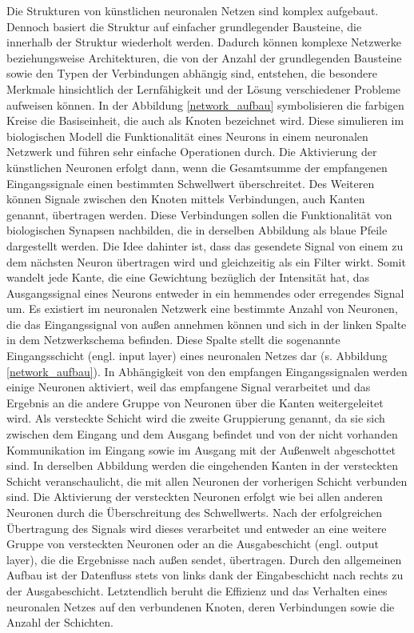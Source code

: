 Die Strukturen von künstlichen neuronalen Netzen sind komplex aufgebaut. Dennoch basiert die Struktur auf einfacher grundlegender Bausteine, die innerhalb der Struktur wiederholt werden. Dadurch können komplexe Netzwerke beziehungsweise Architekturen, die von der Anzahl der grundlegenden Bausteine sowie den Typen der Verbindungen abhängig sind, entstehen, die besondere Merkmale hinsichtlich der Lernfähigkeit und der Lösung verschiedener Probleme aufweisen können. In der Abbildung \ref{network_aufbau} symbolisieren die farbigen Kreise die Basiseinheit, die auch als Knoten bezeichnet wird. Diese simulieren im biologischen Modell die Funktionalität eines Neurons in einem neuronalen Netzwerk und führen sehr einfache Operationen durch. Die Aktivierung der künstlichen Neuronen erfolgt dann, wenn die Gesamtsumme der empfangenen Eingangssignale einen bestimmten Schwellwert überschreitet. Des Weiteren können Signale zwischen den Knoten mittels Verbindungen, auch Kanten genannt, übertragen werden. Diese Verbindungen sollen die Funktionalität von biologischen Synapsen nachbilden, die in derselben Abbildung als blaue Pfeile dargestellt werden. Die Idee dahinter ist, dass das gesendete Signal von einem zu dem nächsten Neuron übertragen wird und gleichzeitig als ein Filter wirkt. Somit wandelt jede Kante, die eine Gewichtung bezüglich der Intensität hat, das Ausgangssignal eines Neurons entweder in ein hemmendes oder erregendes Signal um. Es existiert im neuronalen Netzwerk eine bestimmte Anzahl von Neuronen, die das Eingangssignal von außen annehmen können und sich in der linken Spalte in dem Netzwerkschema befinden. Diese Spalte stellt die sogenannte Eingangsschicht (engl. input layer) eines neuronalen Netzes dar (s. Abbildung \ref{network_aufbau}). In Abhängigkeit von den empfangen Eingangssignalen werden einige Neuronen aktiviert, weil das empfangene Signal verarbeitet und das Ergebnis an die andere Gruppe von Neuronen über die Kanten weitergeleitet wird. Als versteckte Schicht wird die zweite Gruppierung genannt, da sie sich zwischen dem Eingang und dem Ausgang befindet und von der nicht vorhanden Kommunikation im Eingang sowie im Ausgang mit der Außenwelt abgeschottet sind. In derselben Abbildung werden die eingehenden Kanten in der versteckten Schicht veranschaulicht, die mit allen Neuronen der vorherigen Schicht verbunden sind. Die Aktivierung der versteckten Neuronen erfolgt wie bei allen anderen Neuronen durch die Überschreitung des Schwellwerts. Nach der erfolgreichen Übertragung des Signals wird dieses verarbeitet und entweder an eine weitere Gruppe von versteckten Neuronen oder an die Ausgabeschicht (engl. output layer), die die Ergebnisse nach außen sendet, übertragen. Durch den allgemeinen Aufbau ist der Datenfluss stets von links dank der Eingabeschicht nach rechts zu der Ausgabeschicht. Letztendlich beruht die Effizienz und das Verhalten eines neuronalen Netzes auf den verbundenen Knoten, deren Verbindungen sowie die Anzahl der Schichten\cite{Nelli2018}.  


